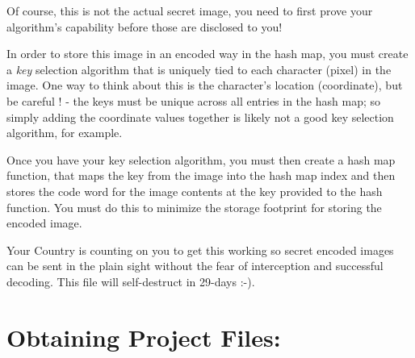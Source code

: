 \documentclass[10pt]{article}
\begin{document}
Of course, this is not the actual secret image, you need to first prove your algorithm's capability before those are disclosed to you!

In order to store this image in an encoded way in the hash map, you must create a \emph{key} selection algorithm that is uniquely tied to each character (pixel) in the image. One way to think about this is the character's location (coordinate), but be careful ! - the keys must be unique across all entries in the hash map; so simply adding the coordinate values together is likely not a good key selection algorithm, for example.

Once you have your key selection algorithm, you must then create a hash map function, that maps the key from the image into the hash map index and then stores the code word for the image contents at the key provided to the hash function. You must do this to minimize the storage footprint for storing the encoded image. 

Your Country is counting on you to get this working so secret encoded images can be sent in the plain sight without the fear of interception and successful decoding. This file will self-destruct in 29-days :-).

\section*{Obtaining Project Files:}
\end{document}
